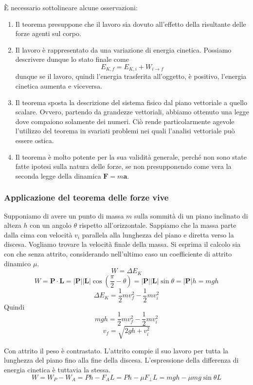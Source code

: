 \noindent È necessario sottolineare alcune osservazioni:
\begin{enumerate}
    \item Il teorema presuppone che il lavoro sia dovuto all'effetto della risultante delle forze agenti sul corpo.
    \item Il lavoro è rappresentato da una variazione di energia cinetica. Possiamo descrivere dunque lo stato finale
    come \[ E_{K,f} = E_{K,i} + W_{i\to f} \] dunque se il lavoro, quindi l'energia trasferita all'oggetto, è positivo,
    l'energia cinetica aumenta e viceversa.

    \item Il teorema sposta la descrizione del sistema fisico dal piano vettoriale a quello scalare. Ovvero, partendo
    da grandezze vettoriali, abbiamo ottenuto una legge dove compaiono solamente dei numeri. Ciò rende particolarmente agevole
    l'utilizzo del teorema in svariati problemi nei quali l'analisi vettoriale può essere ostica.

    \item Il teorema è molto potente per la sua validità generale, perché non sono state fatte ipotesi sulla natura delle
    forze, se non presupponendo come vera la seconda legge della dinamica $\textbf{F} = m\textbf{a}$.
\end{enumerate}

\subsubsection*{Applicazione del teorema delle forze vive}
Supponiamo di avere un punto di massa $m$ sulla sommità di un piano inclinato di
alteza $h$ con
un angolo $\theta$ rispetto all'orizzontale. Sappiamo che la massa parte dalla
cima con velocità $v_i$ parallela alla lunghezza del piano e diretta verso la
discesa. Vogliamo trovare la velocità finale della massa. Si esprima il calcolo sia
con che senza attrito, considerando nell'ultimo caso un coefficiente di attrito
dinamico $\mu$.
\[ W = \Delta E_K \]
\[ W = \mathbf{P}\cdot\mathbf{L} = |\mathbf{P}||\mathbf{L}|\cos\left(\frac{\pi}{2} - \theta\right) = |\mathbf{P}||\mathbf{L}|\sin\theta = |\mathbf{P}|h = mgh \]
\[ \Delta E_K = \frac12mv_f^2 - \frac12mv_i^2 \]
Quindi
\[ mgh = \frac12mv_f^2 - \frac12mv_i^2 \]
\[ v_f = \sqrt{2gh + v_i^2} \]

Con attrito il peso è contrastato. L'attrito compie il suo lavoro per tutta la
lunghezza del piano fino alla fine della discesa. L'espressione della differenza
di energia cinetica è tuttavia la stessa.
\[ W = W_P - W_A = Ph - F_AL = Ph - \mu F_\perp L = mgh - \mu mg\sin\theta L \]